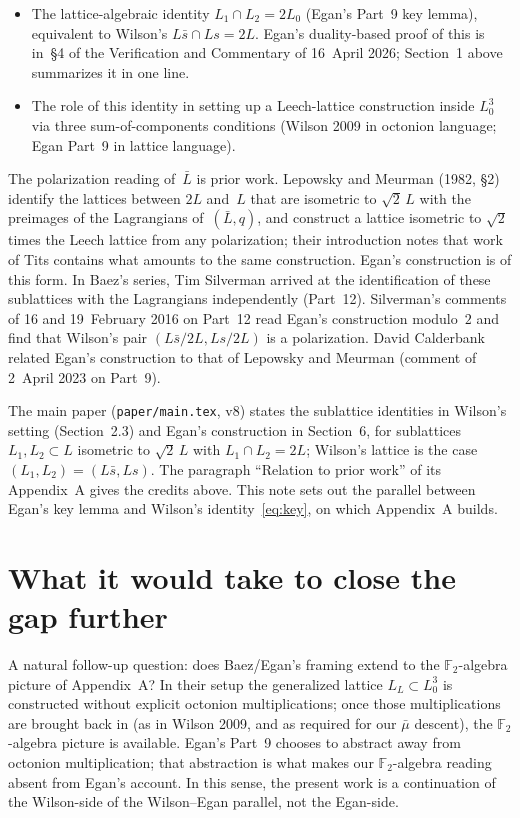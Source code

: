 \documentclass[11pt]{amsart}
\newcommand{\FF}{\mathbb{F}}
\begin{document}
\begin{itemize}
\item The lattice-algebraic identity $L_1 \cap L_2 = 2 L_0$ (Egan's
  Part~9 key lemma), equivalent to Wilson's $L\bar s \cap Ls = 2 L$.
  Egan's duality-based proof of this is in~\S4 of the Verification
  and Commentary of 16~April 2026; Section~1 above summarizes it in
  one line.
\item The role of this identity in setting up a Leech-lattice
  construction inside $L_0^3$ via three sum-of-components conditions
  (Wilson 2009 in octonion language; Egan Part~9 in lattice
  language).
\end{itemize}

The polarization reading of~$\bar L$ is prior work.  Lepowsky and
Meurman (1982, \S2) identify the lattices between $2L$ and~$L$ that
are isometric to $\sqrt{2}\,L$ with the preimages of the Lagrangians
of~$(\bar L, q)$, and construct a lattice isometric to
$\sqrt{2}$ times the Leech lattice from any polarization; their introduction notes that
work of Tits contains what amounts to the same construction.  Egan's
construction is of this form.  In Baez's series, Tim Silverman
arrived at the identification of these sublattices with the
Lagrangians independently (Part~12).  Silverman's comments of 16 and
19~February 2016 on Part~12 read Egan's construction modulo~$2$ and
find that Wilson's pair $(L\bar s/2L, Ls/2L)$ is a polarization.
David Calderbank related Egan's construction to that of Lepowsky and
Meurman (comment of 2~April 2023 on Part~9).

The main paper (\texttt{paper/main.tex}, v8) states the sublattice
identities in Wilson's setting (Section~2.3) and Egan's construction
in Section~6, for sublattices $L_1, L_2 \subset L$ isometric to
$\sqrt{2}\,L$ with $L_1 \cap L_2 = 2L$; Wilson's lattice is the case
$(L_1, L_2) = (L\bar s, Ls)$.  The paragraph ``Relation to prior
work'' of its Appendix~A gives the credits above.  This note sets out
the parallel between Egan's key lemma and Wilson's
identity~\eqref{eq:key}, on which Appendix~A builds.

\section{What it would take to close the gap further}

A natural follow-up question: does Baez/Egan's framing extend to the
$\FF_2$-algebra picture of Appendix~A?  In their setup the
generalized lattice $L_L \subset L_0^3$ is constructed without
explicit octonion multiplications; once those multiplications are
brought back in (as in Wilson 2009, and as required for our
$\bar\mu$ descent), the $\FF_2$-algebra picture is available.
Egan's Part~9 chooses to abstract away from octonion multiplication;
that abstraction is what makes our $\FF_2$-algebra reading absent
from Egan's account.  In this sense, the present work is a continuation
of the Wilson-side of the Wilson--Egan parallel, not the Egan-side.
\end{document}

